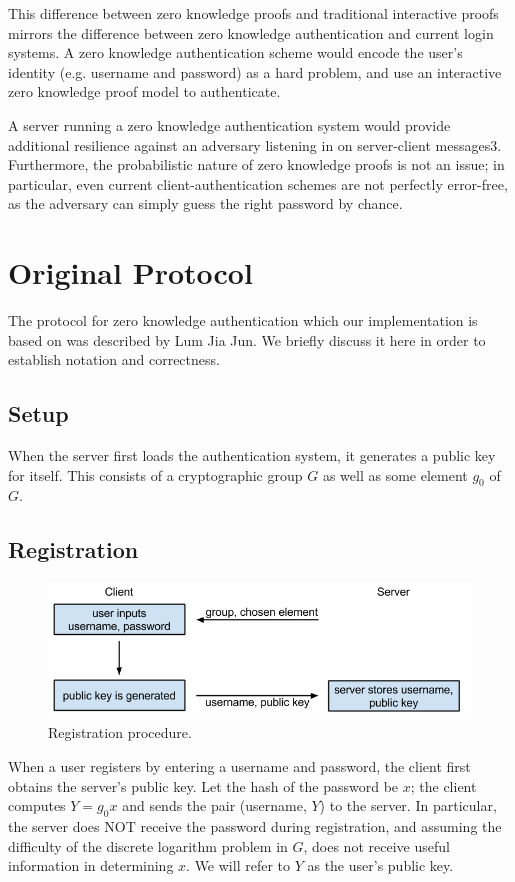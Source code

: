 \documentclass[11pt]{article}
\begin{document}
This difference between zero knowledge proofs and traditional interactive proofs mirrors the difference between zero knowledge authentication and current login systems.  A zero knowledge authentication scheme would encode the user’s identity (e.g. username and password) as a hard problem, and use an interactive zero knowledge proof model to authenticate.

A server running a zero knowledge authentication system would provide additional resilience against an adversary listening in on server-client messages3.  Furthermore, the probabilistic nature of zero knowledge proofs is not an issue; in particular, even current client-authentication schemes are not perfectly error-free, as the adversary can simply guess the right password by chance.

\section{Original Protocol}

The protocol for zero knowledge authentication which our implementation is based on was described by Lum Jia Jun.  We briefly discuss it here in order to establish notation and correctness.

\subsection{Setup}

When the server first loads the authentication system, it generates a public key for itself.  This consists of a cryptographic group $G$ as well as some element $g_0$ of $G$.

\subsection{Registration}

\begin{figure}[h]
  \centering
\includegraphics[scale=0.65]{currentauth.png}

 \caption{Registration procedure.}
 \label{fig:registration}
\end{figure}
When a user registers by entering a username and password, the client first obtains the server’s public key.  Let the hash of the password be $x$; the client computes $Y = g_0x$ and sends the pair (username, $Y$) to the server.  In particular, the server does NOT receive the password during registration, and assuming the difficulty of the discrete logarithm problem in $G$, does not receive useful information in determining $x$.  We will refer to $Y$ as the user’s public key.
\end{document}
